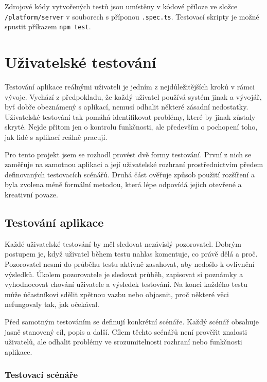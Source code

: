 Zdrojové kódy vytvořených testů jsou umístěny v kódové příloze ve složce \texttt{/platform/server} v souborech s příponou \verb|.spec.ts|.
Testovací skripty je možné spustit příkazem \verb|npm test|.


\section{Uživatelské testování}

Testování aplikace reálnými uživateli je jedním z nejdůležitějších kroků v rámci vývoje. 
Vychází z předpokladu, že každý uživatel používá systém jinak a vývojář, byť dobře obeznámený s aplikací, nemusí odhalit některé zásadní nedostatky. 
Uživatelské testování tak pomáhá identifikovat problémy, které by jinak zůstaly skryté. 
Nejde přitom jen o kontrolu funkčnosti, ale především o pochopení toho, jak lidé s aplikací reálně pracují.

Pro tento projekt jsem se rozhodl provést dvě formy testování.
První z nich se zaměřuje na samotnou aplikaci a její uživatelské rozhraní prostřednictvím předem definovaných testovacích scénářů. 
Druhá část ověřuje způsob použití rozšíření a byla zvolena méně formální metodou, která lépe odpovídá jejich otevřené a kreativní povaze.

\subsection{Testování aplikace}

Každé uživatelské testování by měl sledovat nezávislý pozorovatel. 
Dobrým postupem je, když uživatel během testu nahlas komentuje, co právě dělá a proč. 
Pozorovatel nesmí do průběhu testu aktivně zasahovat, aby nedošlo k ovlivnění výsledků. 
Úkolem pozorovatele je sledovat průběh, zapisovat si poznámky a vyhodnocovat chování uživatele a výsledek testování. 
Na konci každého testu může účastníkovi sdělit zpětnou vazbu nebo objasnit, proč některé věci nefungovaly tak, jak očekával.

Před samotným testováním se definují konkrétní scénáře.
Každý scénář obsahuje jasně stanovený cíl, popis a další. 
Cílem těchto scénářů není prověřit znalosti uživatelů, ale odhalit problémy ve srozumitelnosti rozhraní nebo funkčnosti aplikace.

\subsubsection{Testovací scénáře}

